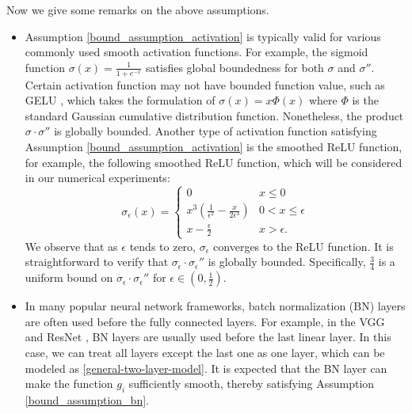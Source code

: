 \documentclass[twoside,11pt]{article}
\begin{document}
\begin{remark}
Now we give some remarks on the above assumptions.
\begin{itemize}
\item[1.] Assumption \ref{bound_assumption_activation} is typically valid for various commonly used smooth activation functions.  For example, the sigmoid function $\sigma(x)=\frac{1}{1+e^{-x}}$ satisfies global boundedness for both $\sigma$ and $\sigma''$. Certain activation function may not have bounded function value, such as {GELU} \citep{hendrycks2016gaussian}, which takes the formulation of $\sigma(x)=x\Phi(x)$ where $\Phi$ is the standard Gaussian cumulative distribution function. Nonetheless, the product $\sigma\cdot\sigma''$ is globally bounded. Another type of activation function satisfying Assumption \ref{bound_assumption_activation} is the smoothed ReLU function, for example, the following smoothed ReLU function, which will be considered in our numerical experiments:
\[
\sigma_\epsilon(x) = \left\{
\begin{array}{cc}
     0 & x \le 0 \\
     x^3\left(\frac{1}{\epsilon^2}-\frac{x}{2\epsilon^3}\right) & 0 < x \le \epsilon \\
     x - \frac{\epsilon}{2} & x > \epsilon.
\end{array}\right.
\]
We observe that as $\epsilon$ tends to zero, $\sigma_\epsilon$ converges to the ReLU function. It is straightforward to verify that $\sigma_\epsilon\cdot\sigma_\epsilon''$ is globally bounded.  
Specifically, $\frac{3}{4}$ is a uniform bound on $\sigma_\epsilon\cdot\sigma_\epsilon''$ for $\epsilon\in(0,\frac{1}{2})$. 

\item[2.] In many popular neural network frameworks, batch normalization (BN) layers \citep{ioffe2015batch} are often used before the fully connected layers. For example, in the VGG \citep{simonyan2014very} and ResNet \citep{he2016deep}, BN layers are usually used before the last linear layer. In this case, we can treat all layers except the last one as one layer, which can be modeled as \eqref{general-two-layer-model}. It is expected that the BN layer can make the function $g_i$ sufficiently smooth, thereby satisfying  Assumption \ref{bound_assumption_bn}.
\end{itemize}
\end{remark}
\end{document}
